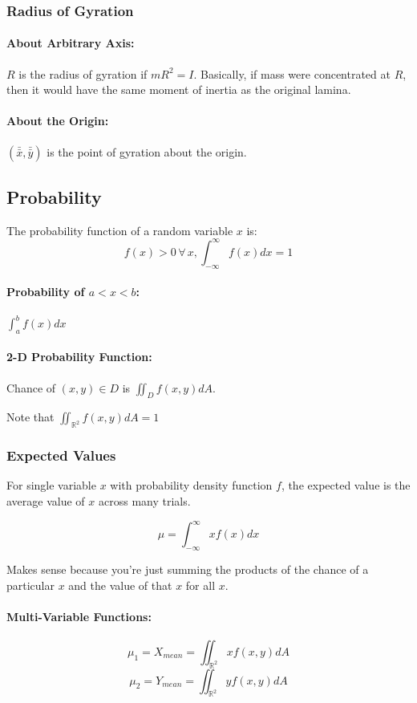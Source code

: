 \documentclass[a4paper,12pt]{report}
\begin{document}
\subsubsection{Radius of Gyration}
\paragraph{About Arbitrary Axis: } $R$ is the radius of gyration if $mR^2 = I$. Basically, if mass were concentrated at $R$,
then it would have the same moment of inertia as the original lamina.

\paragraph{About the Origin: } $(\bar{\bar{x}}, \bar{\bar{y}})$ is the point of gyration about the origin.

\subsection{Probability}
The probability function of a random variable $x$ is: 
$$f(x) > 0\,\forall \, x, \int_{-\infty}^{\infty} f(x) dx = 1$$

\paragraph{Probability of $a < x < b$: } $\int_a^b f(x) dx$

\paragraph{2-D Probability Function: } Chance of $(x, y) \in D$ is $\iint_D f(x, y) dA$.

Note that $\iint_{\mathbb{R}^2} f(x, y) dA = 1$

\subsubsection{Expected Values}
For single variable $x$ with probability density function $f$, the expected value is the 
average value of $x$ across many trials. 

$$\mu = \int_{-\infty}^{\infty} x f(x) dx$$

Makes sense because you're just summing the products of the chance of a particular $x$ 
and the value of that $x$ for all $x$.

\paragraph{Multi-Variable Functions: }
$$\mu_1 = X_{mean} = \iint_{\mathbb{R}^2} x f(x, y) dA$$
$$\mu_2 = Y_{mean} = \iint_{\mathbb{R}^2} y f(x, y) dA$$
\end{document}
